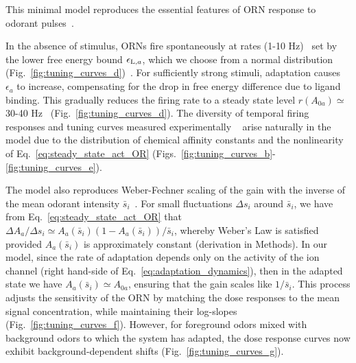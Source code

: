 \documentclass[10pt,prl,aps,showpacs,twocolumn,unsortedaddress,showkeys,linenumbers]{revtex4-1}
\begin{document}
This minimal model reproduces the essential features of ORN response to odorant pulses~\cite{nagel_wilson_biophysical, martelli, cao_WL}. 
{\color {blue} 
In the absence of stimulus, ORNs fire spontaneously at rates (1-10 Hz)~\cite{hallem_carlson} set by the lower free energy bound $\epsilon_{\textup{L}, a}$, which we choose from a normal distribution (Fig.~\ref{fig:tuning_curves_d})~\cite{nagel_wilson_biophysical, martelli}. For sufficiently strong stimuli, adaptation causes $\epsilon_a$ to increase, compensating for the drop in free energy difference due to ligand binding. This gradually reduces the firing rate to a steady state level $r(A_{0a}) \simeq$ 30-40 Hz~\cite{srinivas_elife}  (Fig.~\ref{fig:tuning_curves_d}). The diversity of temporal firing responses and tuning curves measured experimentally ~\cite{hallem_carlson,montague2011similar, stopfer_nat_neuro, stopfer_temporal_channel,stopfer_temporal_model} arise naturally in the model due to the distribution of chemical affinity constants and the nonlinearity of Eq.~\ref{eq:steady_state_act_OR} (Figs.~\ref{fig:tuning_curves_b}-\ref{fig:tuning_curves_e}). 

The model also reproduces Weber-Fechner scaling of the gain with the inverse of the mean odorant intensity $\bar{s}_i$~\cite{srinivas_elife, cao_WL}. For small fluctuations $\Delta s_i$ around $\bar{s}_i$, we have from Eq.~\ref{eq:steady_state_act_OR} that $\Delta A_a/\Delta s_i\simeq A_a\left(\bar{s}_i\right)\left(1-A_a\left(\bar{s}_i\right)\right)/\bar{s}_i$, whereby Weber's Law is satisfied provided $A_a(\bar{s}_i)$ is approximately constant (derivation in Methods). In our model, since the rate of adaptation depends only on the activity of the ion channel (right hand-side of Eq.~\ref{eq:adaptation_dynamics}), then in the adapted state we have $A_a\left(\bar{s}_i\right)\simeq A_{0a}$, ensuring that the gain scales like $1/\bar{s}_i$. This process adjusts the sensitivity of the ORN by matching the dose responses to the mean signal concentration, while maintaining their log-slopes (Fig.~\ref{fig:tuning_curves_f}). However, for foreground odors mixed with background odors to which the system has adapted, the dose response curves now exhibit background-dependent shifts (Fig.~\ref{fig:tuning_curves_g}). %
}
\end{document}
